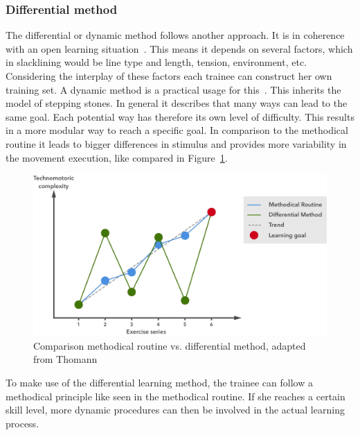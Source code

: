 \subsubsection{Differential method}
The differential or dynamic method follows another approach. It is in coherence with an open learning situation~\cite{Thomann2013-aa}. This means it depends on several factors, which in slacklining would be line type and length, tension, environment, etc. Considering the interplay of these factors each trainee can construct her own training set.
A dynamic method is a practical usage for this~\cite{Beck2008-dl, Schoellhorn1999-ip}. This inherits the model of stepping stones. In general it describes that many ways can lead to the same goal. Each potential way has therefore its own level of difficulty. This results in a more modular way to reach a specific goal. In comparison to the methodical routine it leads to bigger differences in stimulus and provides more variability in the movement execution, like compared in Figure~\ref{fig:3_3_1_comparisonMethods}. 

\begin{figure}[htb]
	\centering
	\begin{minipage}[t]{1\linewidth}
		\centering
		\includegraphics[width=1\linewidth]{Pictures/3_3_1_comparisonMethod2}
		\caption{Comparison methodical routine vs. differential method, adapted from Thomann~\cite{Thomann2013-aa}}
		\label{fig:3_3_1_comparisonMethods}
	\end{minipage}
\end{figure}
To make use of the differential learning method, the trainee can follow a methodical principle like seen in the methodical routine. If she reaches a certain skill level, more dynamic procedures can then be involved in the actual learning process. %

